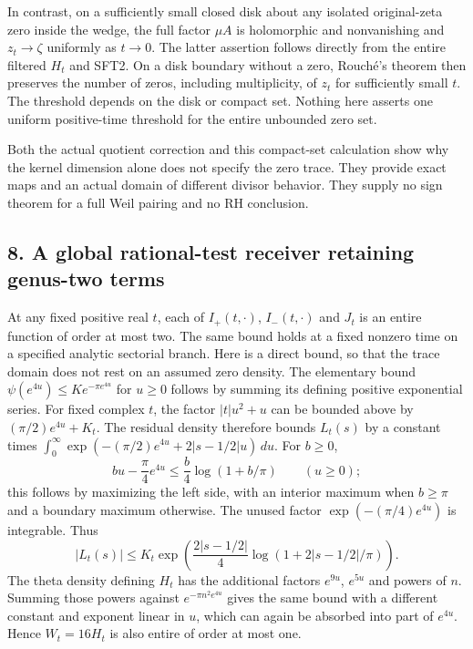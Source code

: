 \documentclass[
  10pt,
  a4paper,
]{article}
\begin{document}
In contrast, on a sufficiently small closed disk about any isolated
original-zeta zero inside the wedge, the full factor \(\mu A\) is
holomorphic and nonvanishing and \(z_t\to\zeta\) uniformly as \(t\to0\).
The latter assertion follows directly from the entire filtered \(H_t\)
and SFT2. On a disk boundary without a zero, Rouché's theorem then
preserves the number of zeros, including multiplicity, of \(z_t\) for
sufficiently small \(t\). The threshold depends on the disk or compact
set. Nothing here asserts one uniform positive-time threshold for the
entire unbounded zero set.

Both the actual quotient correction and this compact-set calculation
show why the kernel dimension alone does not specify the zero trace.
They provide exact maps and an actual domain of different divisor
behavior. They supply no sign theorem for a full Weil pairing and no RH
conclusion.

\subsection{8. A global rational-test receiver retaining genus-two
terms}\label{a-global-rational-test-receiver-retaining-genus-two-terms}

At any fixed positive real \(t\), each of \(I_+(t,\cdot)\),
\(I_-(t,\cdot)\) and \(J_t\) is an entire function of order at most two.
The same bound holds at a fixed nonzero time on a specified analytic
sectorial branch. Here is a direct bound, so that the trace domain does
not rest on an assumed zero density. The elementary bound
\(\psi(e^{4u})\le K e^{-\pi e^{4u}}\) for \(u\ge0\) follows by summing
its defining positive exponential series. For fixed complex \(t\), the
factor \(|t|u^2+u\) can be bounded above by \((\pi/2)e^{4u}+K_t\). The
residual density therefore bounds \(L_t(s)\) by a constant times
\(\int_0^\infty\exp(-(\pi/2)e^{4u}+2|s-1/2|u)\,du\). For \(b\ge0\), \[
 bu-\frac{\pi}{4}e^{4u}
 \le\frac b4\log(1+b/\pi)\qquad(u\ge0);
\] this follows by maximizing the left side, with an interior maximum
when \(b\ge\pi\) and a boundary maximum otherwise. The unused factor
\(\exp(-(\pi/4)e^{4u})\) is integrable. Thus \[
 |L_t(s)|\le K_t
   \exp\!\left(\frac{2|s-1/2|}{4}
                    \log(1+2|s-1/2|/\pi)\right).
 \tag{SFT39}
\] The theta density defining \(H_t\) has the additional factors
\(e^{9u}\), \(e^{5u}\) and powers of \(n\). Summing those powers against
\(e^{-\pi n^2e^{4u}}\) gives the same bound with a different constant
and exponent linear in \(u\), which can again be absorbed into part of
\(e^{4u}\). Hence \(W_t=16H_t\) is also entire of order at most one.
\end{document}
